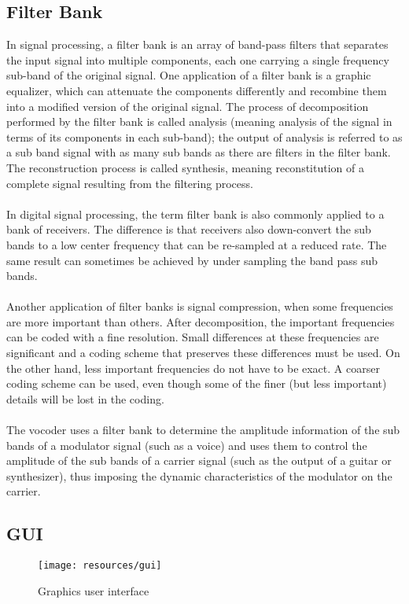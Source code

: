 \subsection{Filter Bank}
In signal processing, a filter bank is an array of band-pass filters that separates the input
signal into multiple components, each one carrying a single frequency sub-band of the
original signal. One application of a filter bank is a graphic equalizer, which can attenuate the
components differently and recombine them into a modified version of the original signal.
The process of decomposition performed by the filter bank is called analysis (meaning
analysis of the signal in terms of its components in each sub-band); the output of analysis is
referred to as a sub band signal with as many sub bands as there are filters in the filter bank.
The reconstruction process is called synthesis, meaning reconstitution of a complete signal
resulting from the filtering process.\\
\\
In digital signal processing, the term filter bank is also commonly applied to a bank of
receivers. The difference is that receivers also down-convert the sub bands to a low center
frequency that can be re-sampled at a reduced rate. The same result can sometimes be
achieved by under sampling the band pass sub bands.\\
\\
Another application of filter banks is signal compression, when some frequencies are more
important than others. After decomposition, the important frequencies can be coded with a
fine resolution. Small differences at these frequencies are significant and a coding scheme
that preserves these differences must be used. On the other hand, less important frequencies
do not have to be exact. A coarser coding scheme can be used, even though some of the finer
(but less important) details will be lost in the coding.\\
\\
The vocoder uses a filter bank to determine the amplitude information of the sub bands of a
modulator signal (such as a voice) and uses them to control the amplitude of the sub bands of
a carrier signal (such as the output of a guitar or synthesizer), thus imposing the dynamic
characteristics of the modulator on the carrier.\\

\newpage
\subsection{GUI}
\begin{figure}[h!]
        \texttt{[image: resources/gui]}
        \caption{Graphics user interface}
\end{figure}
